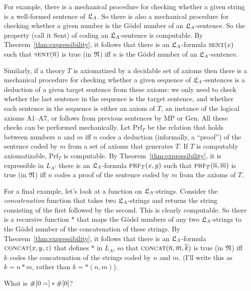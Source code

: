 For example,
there is a mechanical procedure for checking whether
a given string is a well-formed sentence of $\mathfrak{L}_A$.
So there is also a mechanical procedure for checking whether
a given number is the Gödel number of an $\mathfrak{L}_A$-sentence.
So the property (call it $\mathrm{Sent}$) of coding an $\mathfrak{L}_A$-sentence is computable.
By Theorem~\ref{thm:expressibility},
it follows that
there is an $\mathfrak{L}_A$-formula $\smallcaps{Sent}(x)$
such that $\smallcaps{Sent}(\num{n})$ is true (in $\mathfrak{N}$) iff
$n$ is the Gödel number of an $\mathfrak{L}_A$-sentence.

Similarly,
if a theory $T$ is axiomatized by a decidable set of axioms then
there is a mechanical procedure for checking whether
a given sequence of $\mathfrak{L}_A$-sentences is a deduction of a given target sentence from these axioms:
we only need to check whether the last sentence in the sequence is the target sentence,
and whether each sentence in the sequence is either
an axiom of $T$,
an instance of the logical axioms A1--A7, or
follows from previous sentences by MP or Gen.
All these checks can be performed mechanically.
Let $\mathrm{Prf}_T$ be the relation that holds between numbers $n$ and $m$
iff $n$ codes a deduction (informally, a ``proof'') of the sentence coded by $m$ from
a set of axioms that generates $T$.
If $T$ is computably axiomatizable,
$\mathrm{Prf}_T$ is computable.
By Theorem~\ref{thm:expressibility},
it is expressible in $L_A$:
there is an $\mathfrak{L}_A$-formula $\smallcaps{Prf}_T(x,y)$
such that $\smallcaps{Prf}_T(\num{n},\num{m})$ is true (in $\mathfrak{N}$) iff
$n$ codes a proof of the sentence coded by $m$ from the axioms of $T$.

For a final example,
let's look at a function on $\mathfrak{L}_A$-strings.
Consider the \emph{concatenation} function that
takes two $\mathfrak{L}_A$-strings and returns the string consisting of the first followed by the second.
This is clearly computable.
So there is a recursive function $*$ that maps
the Gödel numbers of any two $\mathfrak{L}_A$-strings to the Gödel number of the concatenation of these strings.
By Theorem~\ref{thm:expressibility},
it follows that
there is an $\mathfrak{L}_A$-formula $\smallcaps{Concat}(x,y,z)$
that defines $*$ in $L_A$,
so that
$\smallcaps{Concat}(\num{n},\num{m},\num{k})$ is true (in $\mathfrak{N}$) iff
$k$ codes the concatenation of the strings coded by $n$ and $m$.
(I'll write this as $k = n * m$, rather than $k = *(n,m)$).

\begin{exercise}
  What is $\#[0=] * \#[0]$?
\end{exercise}

